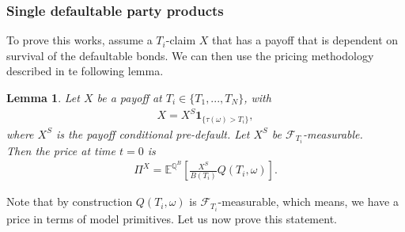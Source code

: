 \documentclass[12pt]{article}
\newtheorem{lemma}[theorem]{Lemma}
\begin{document}
	\subsubsection{Single defaultable party products}
	To prove this works, assume a $T_i$-claim $X$ that has a payoff that is dependent on survival of the defaultable bonds. We can then use the pricing methodology described in te following lemma.
	\begin{lemma}\label{lm:pricingdefaultableclaims}
		Let $X$ be a payoff at $T_i \in \{T_1, ..., T_N\}$, with
		\begin{align*}
			X = X^S \mathbf{1}_{\{\tau(\omega) > T_i\}},
		\end{align*}
		where $X^S$ is the payoff conditional pre-default. Let $X^S$ be $\mathcal{F}_{T_i}$-measurable.\\
		Then the price at time $t=0$ is
		\begin{align*}
			\Pi^X = \mathbb{E}^{\mathbb{Q}^B}\left[ \frac{X^S}{B(T_i)} Q\left(T_i,\omega\right) \right].
		\end{align*}
	\end{lemma}
	Note that by construction $Q(T_i, \omega)$ is $\mathcal{F}_{T_i}$-measurable, which means, we have a price in terms of model primitives. Let us now prove this statement.
\end{document}
